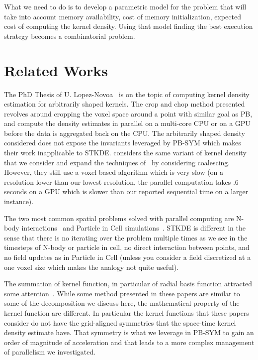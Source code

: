 \documentclass{article}
\begin{document}
What we need to do is to develop a parametric model for the problem
that will take into account memory availability, cost of memory
initialization, expected cost of computing the kernel density. Using
that model finding the best execution strategy becomes a combinatorial
problem.

\section{Related Works}

\label{sec:soa}

The PhD Thesis of U. Lopez-Novoa~\cite{LopezNovoa} is on the topic of
computing kernel density estimation for arbitrarily shaped
kernels. The crop and chop method presented revolves around cropping
the voxel space around a point with similar goal as PB, and compute
the density estimates in parallel on a multi-core CPU or on a GPU
before the data is aggregated back on the CPU. The arbitrarily shaped
density considered does not expose the invariants leveraged by PB-SYM
which makes their work inapplicable to STKDE. \cite{Eaglin17} considers
the same variant of kernel density that we consider and expand the
techniques of~\cite{LopezNovoa} by considering coalescing. However,
they still use a voxel based algorithm which is very slow (on a
resolution lower than our lowest resolution, the parallel computation
takes .6 seconds on a GPU which is slower than our reported sequential
time on a larger instance).

The two most common spatial problems solved with parallel computing
are N-body interactions~\cite{Aaseth03} and Particle in Cell
simulations~\cite{karimabadi06}. STKDE is different in the sense that there
is no iterating over the problem multiple times as we see in the
timesteps of N-body or particle in cell, no direct interaction between
points, and no field updates as in Particle in Cell (unless you
consider a field discretized at a one voxel size which makes the
analogy not quite useful).

The summation of kernel function, in particular of radial basis
function attracted some
attention~\cite{MarchXiaoYuBiros2015,FornbergLarssonFlyer2011,YangDuraiswamiGumerovDavis2003}. While
some method presented in these papers are similar to some of the
decomposition we discuss here, the mathematical property of the kernel
function are different. In particular the kernel functions that these
papers consider do not have the grid-aligned symmetries that the
space-time kernel density estimate have. That symmetry is what we
leverage in PB-SYM to gain an order of magnitude of acceleration and
that leads to a more complex management of parallelism we investigated.
\end{document}
